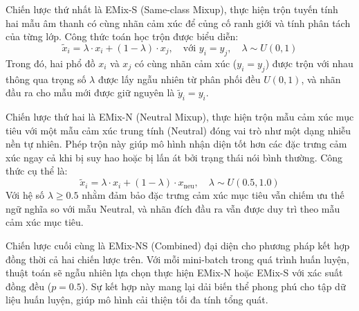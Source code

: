 Chiến lược thứ nhất là EMix-S (Same-class Mixup), thực hiện trộn tuyến tính hai mẫu âm thanh có cùng nhãn cảm xúc để củng cố ranh giới và tính phân tách của từng lớp. Công thức toán học trộn được biểu diễn:
\begin{equation}
    \tilde{x}_i = \lambda \cdot x_i + (1 - \lambda) \cdot x_j, \quad \text{với } y_i = y_j, \quad \lambda \sim U(0, 1)
    \label{eq:emix_s}
\end{equation}
Trong đó, hai phổ đồ $x_i$ và $x_j$ có cùng nhãn cảm xúc ($y_i = y_j$) được trộn với nhau thông qua trọng số $\lambda$ được lấy ngẫu nhiên từ phân phối đều $U(0, 1)$, và nhãn đầu ra cho mẫu mới được giữ nguyên là $\tilde{y}_i = y_i$.

Chiến lược thứ hai là EMix-N (Neutral Mixup), thực hiện trộn mẫu cảm xúc mục tiêu với một mẫu cảm xúc trung tính (Neutral) đóng vai trò như một dạng nhiễu nền tự nhiên. Phép trộn này giúp mô hình nhận diện tốt hơn các đặc trưng cảm xúc ngay cả khi bị suy hao hoặc bị lấn át bởi trạng thái nói bình thường. Công thức cụ thể là:
\begin{equation}
    \tilde{x}_i = \lambda \cdot x_i + (1 - \lambda) \cdot x_{\text{neu}}, \quad \lambda \sim U(0.5, 1.0)
    \label{eq:emix_n}
\end{equation}
Với hệ số $\lambda \geq 0.5$ nhằm đảm bảo đặc trưng cảm xúc mục tiêu vẫn chiếm ưu thế ngữ nghĩa so với mẫu Neutral, và nhãn đích đầu ra vẫn được duy trì theo mẫu cảm xúc mục tiêu.

Chiến lược cuối cùng là EMix-NS (Combined) đại diện cho phương pháp kết hợp đồng thời cả hai chiến lược trên. Với mỗi mini-batch trong quá trình huấn luyện, thuật toán sẽ ngẫu nhiên lựa chọn thực hiện EMix-N hoặc EMix-S với xác suất đồng đều ($p = 0.5$). Sự kết hợp này mang lại dải biến thể phong phú cho tập dữ liệu huấn luyện, giúp mô hình cải thiện tối đa tính tổng quát.
